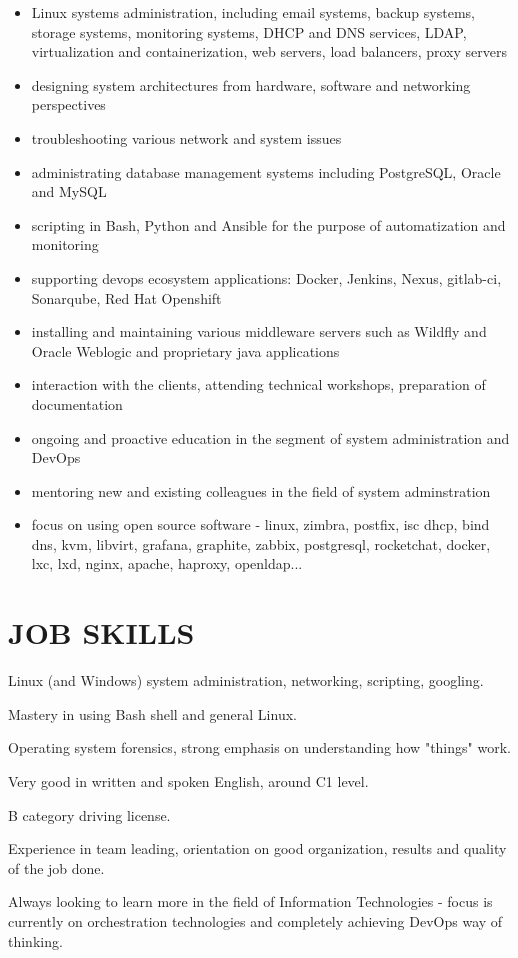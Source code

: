 \documentclass{cv}
\begin{document}
\begin{itemize}
    \setlength\itemsep{0.1cm}
    \item Linux systems administration, including email systems, backup systems, storage systems, monitoring systems, DHCP and DNS services, LDAP, virtualization and containerization, web servers, load balancers, proxy servers
    \item designing system architectures from hardware, software and networking perspectives
    \item troubleshooting various network and system issues 
    \item administrating database management systems including PostgreSQL, Oracle and MySQL
    \item scripting in Bash, Python and Ansible for the purpose of automatization and monitoring
    \item supporting devops ecosystem applications: Docker, Jenkins, Nexus, gitlab-ci, Sonarqube, Red Hat Openshift
    \item installing and maintaining various middleware servers such as Wildfly and Oracle Weblogic and proprietary java applications
    \item interaction with the clients, attending technical workshops, preparation of documentation
    \item ongoing and proactive education in the segment of system administration and DevOps
    \item mentoring new and existing colleagues in the field of system adminstration
    \item focus on using open source software - linux, zimbra, postfix, isc dhcp, bind dns, kvm, libvirt, grafana, graphite, zabbix, postgresql, rocketchat, docker, lxc, lxd, nginx, apache, haproxy, openldap...
\end{itemize}
\section{JOB SKILLS}
Linux (and Windows) system administration, networking, scripting, googling.

Mastery in using Bash shell and general Linux.

Operating system forensics, strong emphasis on understanding how "things" work.

Very good in written and spoken English, around C1 level.

B category driving license.

Experience in team leading, orientation on good organization, results and quality of the job done.

Always looking to learn more in the field of Information Technologies - focus is currently on orchestration technologies and completely achieving DevOps way of thinking.
\end{document}
